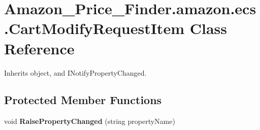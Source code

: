 \hypertarget{class_amazon___price___finder_1_1amazon_1_1ecs_1_1_cart_modify_request_item}{\section{Amazon\-\_\-\-Price\-\_\-\-Finder.\-amazon.\-ecs.\-Cart\-Modify\-Request\-Item Class Reference}
\label{class_amazon___price___finder_1_1amazon_1_1ecs_1_1_cart_modify_request_item}
}


 




Inherits object, and I\-Notify\-Property\-Changed.

\subsection*{Protected Member Functions}
\begin{DoxyCompactItemize}
\item 
\hypertarget{class_amazon___price___finder_1_1amazon_1_1ecs_1_1_cart_modify_request_item_ae517999e41110209ef7d19cb7198d0a2}{void {\bfseries Raise\-Property\-Changed} (string property\-Name)}\label{class_amazon___price___finder_1_1amazon_1_1ecs_1_1_cart_modify_request_item_ae517999e41110209ef7d19cb7198d0a2}

\end{DoxyCompactItemize}
